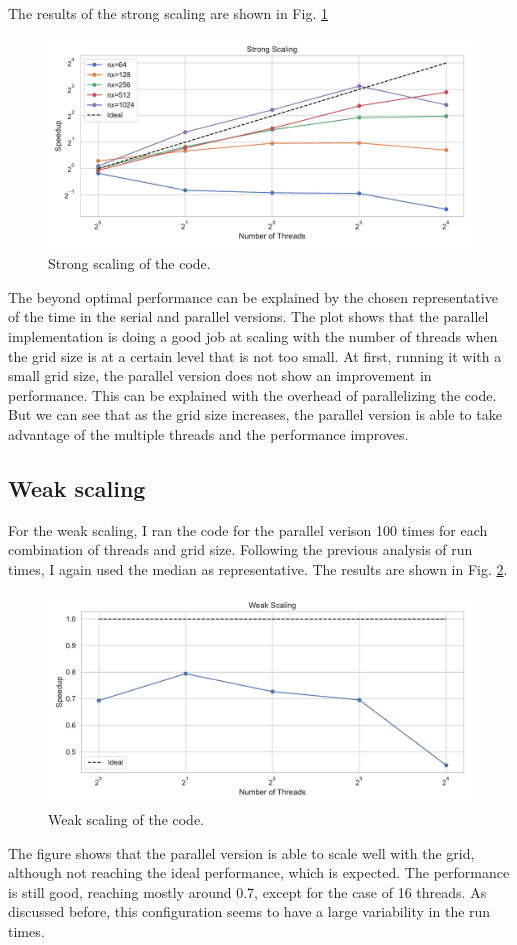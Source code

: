 \documentclass[unicode,11pt,a4paper,oneside,numbers=endperiod,openany]{scrartcl}
\begin{document}
The results of the strong scaling are shown in Fig. \ref{im:strong_scaling}
\begin{figure}
    \centering
    \includegraphics[width=\textwidth]{../mini_app/strong_scaling_plot.pdf}
    \caption{Strong scaling of the code.}
    \label{im:strong_scaling}
\end{figure}
The beyond optimal performance can be explained by the chosen representative of
the time in the serial and parallel versions. The plot shows that the parallel
implementation is doing a good job at scaling with the number of threads when
the grid size is at a certain level that is not too small.
At first, running it with a small grid size, the parallel version does not show
an improvement in performance. This can be explained with the overhead of
parallelizing the  code. But we can see that as the grid size increases, the
parallel version is able to take advantage of the multiple threads and the
performance improves.

\subsection*{Weak scaling}
For the weak scaling, I ran the code for the parallel verison 100 times for each
combination of threads and grid size. 
Following the previous analysis of run times, I again
used the median as representative. 
The results are shown in Fig. \ref{im:weak_scaling}.

\begin{figure}
    \centering
    \includegraphics[width=\textwidth]{../mini_app/weak_scaling_plot.pdf}
    \caption{Weak scaling of the code.}
    \label{im:weak_scaling}
\end{figure}
The figure shows that the parallel version is able to scale well with the grid,
although not reaching the ideal performance, which is expected. The performance
is still good, reaching mostly around 0.7, except for the case of 16 threads. As
discussed before, this configuration seems to have a large variability in the
run times.
\end{document}
